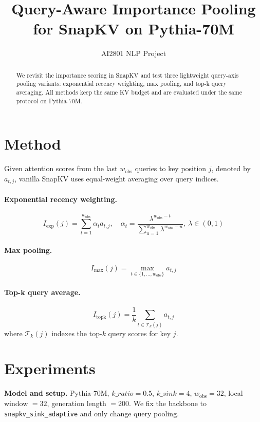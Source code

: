 \documentclass{article}
\title{Query-Aware Importance Pooling for SnapKV on Pythia-70M}
\author{AI2801 NLP Project}
\date{}
\begin{document}
\maketitle

\begin{abstract}
We revisit the importance scoring in SnapKV and test three lightweight query-axis pooling variants: exponential recency weighting, max pooling, and top-k query averaging. All methods keep the same KV budget and are evaluated under the same protocol on Pythia-70M.
\end{abstract}

\section{Method}
Given attention scores from the last $w_{\text{obs}}$ queries to key position $j$, denoted by $a_{t,j}$, vanilla SnapKV uses equal-weight averaging over query indices.

\paragraph{Exponential recency weighting.}
\begin{equation}
I_{\text{exp}}(j) = \sum_{t=1}^{w_{\text{obs}}}\alpha_t a_{t,j}, \quad
\alpha_t = \frac{\lambda^{w_{\text{obs}}-t}}{\sum_{u=1}^{w_{\text{obs}}}\lambda^{w_{\text{obs}}-u}}, \ \lambda \in (0,1)
\end{equation}

\paragraph{Max pooling.}
\begin{equation}
I_{\text{max}}(j) = \max_{t \in \{1,\dots,w_{\text{obs}}\}} a_{t,j}
\end{equation}

\paragraph{Top-k query average.}
\begin{equation}
I_{\text{topk}}(j) = \frac{1}{k}\sum_{t \in \mathcal{T}_k(j)} a_{t,j}
\end{equation}
where $\mathcal{T}_k(j)$ indexes the top-$k$ query scores for key $j$.

\section{Experiments}
\textbf{Model and setup.} Pythia-70M, $k\_ratio=0.5$, $k\_sink=4$, $w_{\text{obs}}=32$, local window $=32$, generation length $=200$. We fix the backbone to \texttt{snapkv\_sink\_adaptive} and only change query pooling.
\end{document}
